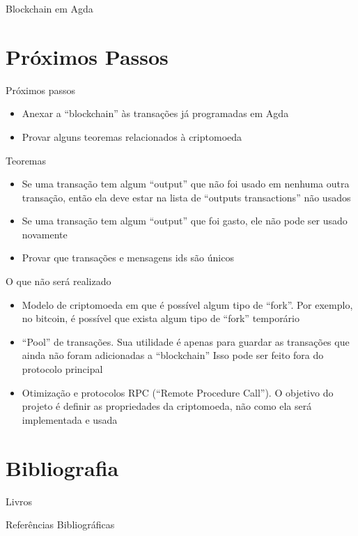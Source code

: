\documentclass{beamer}
\begin{document}
\begin{frame}{Blockchain em Agda}
  \begin{adjustwidth}{-3.5em}{-2em} \fontsize{8}{11}
  \end{adjustwidth}
\end{frame}
  
\section{Próximos Passos}

\begin{frame}{Próximos passos}
  \begin{itemize}
    \item Anexar a \foreignquote{english}{blockchain} às transações já programadas em Agda
    \item Provar alguns teoremas relacionados à criptomoeda
  \end{itemize}
\end{frame}

\begin{frame}{Teoremas}
  \begin{itemize}
    \item Se uma transação tem algum \foreignquote{english}{output} que não foi usado em nenhuma outra transação, 
      então ela deve estar na lista de \foreignquote{english}{outputs transactions} não usados
    \item Se uma transação tem algum \foreignquote{english}{output} que foi gasto, ele não pode ser usado novamente
      \item Provar que transações e mensagens ids são únicos
  \end{itemize}
\end{frame}

\begin{frame}{O que não será realizado}
  \begin{itemize}
    \item Modelo de criptomoeda em que é possível algum tipo de \foreignquote{english}{fork}. Por exemplo, no bitcoin, é possível que exista algum tipo de \foreignquote{english}{fork} temporário
    \item \foreignquote{english}{Pool} de transações. Sua utilidade é apenas para guardar as transações que ainda não foram adicionadas a \foreignquote{english}{blockchain}
    Isso pode ser feito fora do protocolo principal
  \item Otimização e protocolos RPC (\foreignquote{english}{Remote Procedure Call}). O objetivo do projeto é definir as propriedades da criptomoeda, não como ela será implementada e usada
  \end{itemize}
\end{frame}

\section{Bibliografia}

 \begin{frame}{Livros}
 \end{frame}
  

\begin{frame}{Referências Bibliográficas}
  
  
\end{frame}
\end{document}
